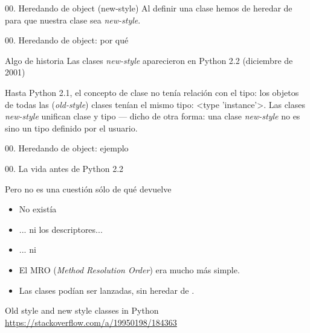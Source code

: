 
\begin{frame}{00. Heredando de object (new-style)}
  \centering
  Al definir una clase hemos de heredar de  para que
  nuestra clase sea \textit{new-style}.

\end{frame}

\begin{frame}{00. Heredando de object: por qué}
 \begin{block}{Algo de historia}
    \centering Las clases \textit{new-style} aparecieron en Python 2.2
    (diciembre de 2001)
  \end{block}

 \begin{justify}
   Hasta Python 2.1, el concepto de clase no tenía relación con el
   tipo: los objetos de todas las (\textit{old-style}) clases tenían
   el mismo tipo: \textless type 'instance'\textgreater. Las clases
   \textit{new-style} unifican clase y tipo — dicho de otra forma: una
   clase \textit{new-style} no es sino un tipo definido por el
   usuario.
 \end{justify}
\end{frame}

\begin{frame}{00. Heredando de object: ejemplo}
\end{frame}

\begin{frame}{00. La vida antes de Python 2.2}
 \begin{alertblock}{}
    \centering Pero no es una cuestión sólo de qué devuelve 
  \end{alertblock}

  \small
  \begin{itemize}
    \item No existía 
    \item ... ni los descriptores...
    \item ... ni 
    \item El MRO (\textit{Method Resolution Order}) era mucho más simple.
    \item Las clases podían ser lanzadas, sin heredar de .
  \end{itemize}

  \small
  \begin{block}{\centering Old style and new style classes in Python}
    \centering \url{https://stackoverflow.com/a/19950198/184363}
  \end{block}
\end{frame}

